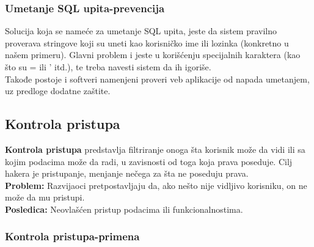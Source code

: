 \documentclass[a4paper]{article}
\begin{document}
\subsubsection{Umetanje SQL upita-prevencija}

Solucija koja se nameće za umetanje SQL upita, jeste da sistem pravilno proverava stringove koji su uneti kao korisničko ime ili lozinka (konkretno u našem primeru). Glavni problem i jeste u korišćenju specijalnih karaktera (kao što su = ili ' itd.)\cite{SQL_prev}, te treba navesti sistem da ih igoriše.\cite{Sanit}\\
Takođe postoje i softveri namenjeni proveri  veb aplikacije od napada umetanjem, uz predloge dodatne zaštite.

\subsection{Kontrola pristupa}

\textbf{Kontrola pristupa}\cite{AC} predstavlja filtriranje onoga šta korisnik može da vidi ili sa kojim podacima može da radi,  u zavisnosti od toga koja prava poseduje. Cilj hakera je pristupanje, menjanje nečega za šta ne poseduju prava.\\
\textbf{Problem:} Razvijaoci pretpostavljaju da, ako nešto nije vidljivo korisniku, on ne može da mu pristupi.\\
\textbf{Posledica:} Neovlašćen pristup podacima ili funkcionalnostima.

\subsubsection{Kontrola pristupa-primena}
\end{document}

